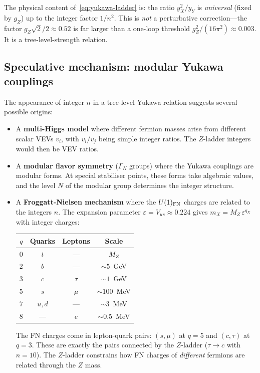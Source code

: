 \documentclass[11pt]{article}
\begin{document}
\noindent
The physical content of~\eqref{eq:yukawa-ladder} is: the ratio
$y_X^2/y_Y$ is \emph{universal} (fixed by $g_Z$) up to the
integer factor $1/n^2$.  This is \emph{not} a perturbative
correction---the factor $g_Z\sqrt{2}/2 \approx 0.52$ is far
larger than a one-loop threshold $g_Z^2/(16\pi^2)\approx 0.003$.
It is a tree-level-strength relation.

\subsection{Speculative mechanism: modular Yukawa couplings}

The appearance of integer $n$ in a tree-level Yukawa relation
suggests several possible origins:
\begin{itemize}
  \item A \textbf{multi-Higgs model} where different fermion
    masses arise from different scalar VEVs $v_i$, with
    $v_i/v_j$ being simple integer ratios.  The $Z$-ladder
    integers would then be VEV ratios.
  \item A \textbf{modular flavor symmetry} ($\Gamma_N$ groups)
    where the Yukawa couplings are modular forms.  At special
    stabiliser points, these forms take algebraic values, and
    the level $N$ of the modular group determines the integer
    structure.
  \item A \textbf{Froggatt-Nielsen mechanism} where the
    $U(1)_{\rm FN}$ charges are related to the integers $n$.
    The expansion parameter $\varepsilon = V_{us}\approx 0.224$
    gives $m_X = M_Z\,\varepsilon^{q_X}$ with integer charges:

    \begin{center}\small
    \begin{tabular}{@{}c c c c@{}}
    \toprule
    $q$ & Quarks & Leptons & Scale \\
    \midrule
    $0$ & $t$ & --- & $M_Z$ \\
    $2$ & $b$ & --- & ${\sim}5$~GeV \\
    $3$ & $c$ & $\tau$ & ${\sim}1$~GeV \\
    $5$ & $s$ & $\mu$ & ${\sim}100$~MeV \\
    $7$ & $u,d$ & --- & ${\sim}3$~MeV \\
    $8$ & --- & $e$ & ${\sim}0.5$~MeV \\
    \bottomrule
    \end{tabular}
    \end{center}

    \noindent
    The FN charges come in lepton-quark pairs: $(s,\mu)$ at
    $q=5$ and $(c,\tau)$ at $q=3$.  These are exactly the pairs
    connected by the $Z$-ladder ($\tau\to c$ with $n=10$).
    The $Z$-ladder constrains how FN charges of \emph{different}
    fermions are related through the $Z$ mass.
\end{itemize}
\end{document}
